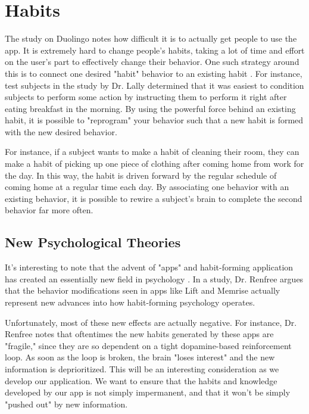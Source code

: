 \section{Habits}
The study on Duolingo notes how difficult it is to actually get people to use the app. It is extremely hard to change people's habits, taking a lot of time and effort on the user's part to effectively change their behavior. One such strategy around this is to connect one desired "habit" behavior to an existing habit \cite{lally2010habits}. For instance, test subjects in the study by Dr. Lally determined that it was easiest to condition subjects to perform some action by instructing them to perform it right after eating breakfast in the morning. By using the powerful force behind an existing habit, it is possible to "reprogram" your behavior such that a new habit is formed with the new desired behavior.

For instance, if a subject wants to make a habit of cleaning their room, they can make a habit of picking up one piece of clothing after coming home from work for the day. In this way, the habit is driven forward by the regular schedule of coming home at a regular time each day. By associating one behavior with an existing behavior, it is possible to rewire a subject's brain to complete the second behavior far more often.

\subsection{New Psychological Theories}
It's interesting to note that the advent of "apps" and habit-forming application has created an essentially new field in psychology \cite{renfree2016don}. In a study, Dr. Renfree argues that the behavior modifications seen in apps like Lift and Memrise actually represent new advances into how habit-forming psychology operates.

Unfortunately, most of these new effects are actually negative. For instance, Dr. Renfree notes that oftentimes the new habits generated by these apps are "fragile," since they are so dependent on a tight dopamine-based reinforcement loop. As soon as the loop is broken, the brain "loses interest" and the new 
information is deprioritized. This will be an interesting consideration as we develop our application. We want to ensure that the habits and knowledge developed by our app is not simply impermanent, and that it won't be simply "pushed out" by new information.
